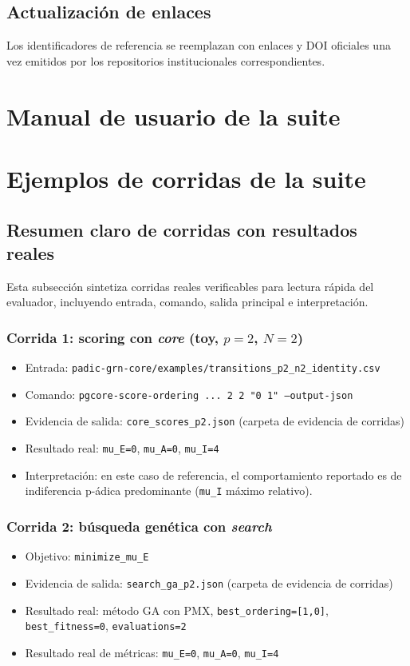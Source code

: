 \documentclass[11pt]{article}
\begin{document}
\subsection{Actualización de enlaces}
Los identificadores de referencia se reemplazan con enlaces y DOI oficiales una vez emitidos por los repositorios institucionales correspondientes.

\section{Manual de usuario de la suite}

\section{Ejemplos de corridas de la suite}
\subsection{Resumen claro de corridas con resultados reales}
Esta subsección sintetiza corridas reales verificables para lectura rápida del
evaluador, incluyendo entrada, comando, salida principal e interpretación.

\subsubsection*{Corrida 1: scoring con \textit{core} (toy, $p=2$, $N=2$)}
\begin{itemize}
  \item Entrada: \texttt{padic-grn-core/examples/transitions\_p2\_n2\_identity.csv}
  \item Comando: \texttt{pgcore-score-ordering ... 2 2 "0 1" --output-json}
  \item Evidencia de salida: \texttt{core\_scores\_p2.json} (carpeta de evidencia de corridas)
  \item Resultado real: \texttt{mu\_E=0}, \texttt{mu\_A=0}, \texttt{mu\_I=4}
  \item Interpretación: en este caso de referencia, el comportamiento reportado
  es de indiferencia p-ádica predominante (\texttt{mu\_I} máximo relativo).
\end{itemize}

\subsubsection*{Corrida 2: búsqueda genética con \textit{search}}
\begin{itemize}
  \item Objetivo: \texttt{minimize\_mu\_E}
  \item Evidencia de salida: \texttt{search\_ga\_p2.json} (carpeta de evidencia de corridas)
  \item Resultado real: método GA con PMX, \texttt{best\_ordering=[1,0]},
  \texttt{best\_fitness=0}, \texttt{evaluations=2}
  \item Resultado real de métricas: \texttt{mu\_E=0}, \texttt{mu\_A=0},
  \texttt{mu\_I=4}
\end{itemize}
\end{document}
